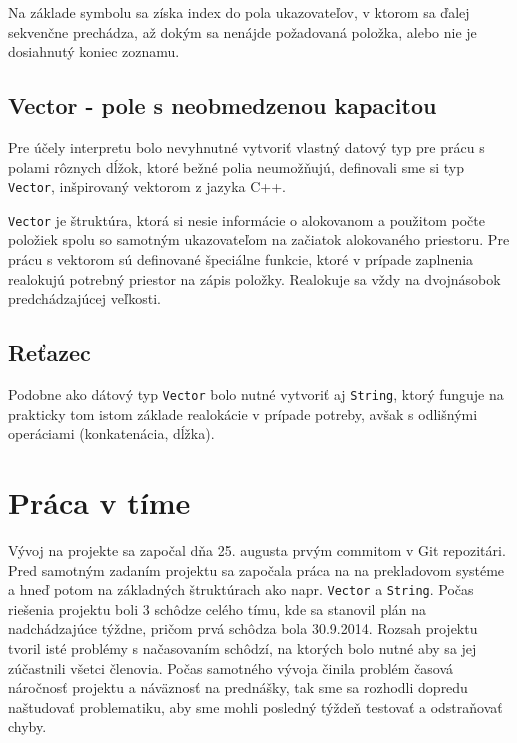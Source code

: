 \documentclass[12pt,a4paper,titlepage,final]{article}
\begin{document}
Na základe symbolu sa získa index do pola ukazovateľov, v ktorom sa ďalej
 sekvenčne prechádza, až dokým sa nenájde požadovaná položka, alebo nie je
 dosiahnutý koniec zoznamu.
 
\subsection{Vector - pole s neobmedzenou kapacitou}
Pre účely interpretu bolo nevyhnutné vytvoriť vlastný datový typ pre prácu
s polami rôznych dĺžok, ktoré bežné polia neumožňujú, definovali sme si
typ \texttt{Vector}, inšpirovaný vektorom z jazyka C++. 

\texttt{Vector} je štruktúra, ktorá si nesie informácie o alokovanom a použitom 
počte položiek spolu so samotným ukazovateľom na začiatok alokovaného priestoru. 
Pre prácu s vektorom sú definované špeciálne funkcie, ktoré v prípade zaplnenia
realokujú potrebný priestor na zápis položky. Realokuje sa vždy na dvojnásobok
predchádzajúcej veľkosti.


\subsection{Reťazec}
Podobne ako dátový typ \texttt{Vector} bolo nutné vytvoriť aj \texttt{String},
ktorý funguje na prakticky tom istom základe realokácie v prípade potreby,
avšak s odlišnými operáciami (konkatenácia, dĺžka).


\section{Práca v tíme}
Vývoj na projekte sa započal dňa 25. augusta prvým commitom v Git repozitári.
 Pred samotným zadaním projektu sa započala práca na na prekladovom systéme
 a hneď potom na základných štruktúrach ako 
 napr. \texttt{Vector} a \texttt{String}.
Počas riešenia projektu boli 3 schôdze celého tímu, kde sa stanovil plán na
nadchádzajúce týždne, pričom prvá schôdza bola 30.9.2014.
Rozsah projektu tvoril isté problémy s načasovaním schôdzí, na ktorých bolo
nutné aby sa jej zúčastnili všetci členovia. Počas samotného vývoja
činila problém časová náročnosť projektu a náväznosť na prednášky, tak sme sa
rozhodli dopredu naštudovať problematiku, aby sme mohli posledný týždeň testovať
a odstraňovať chyby.
\end{document}
